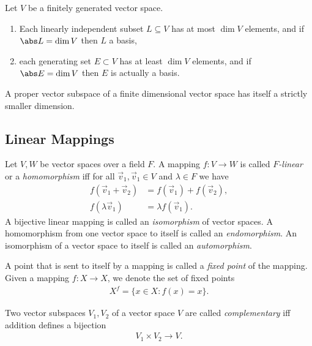 \documentclass{article}
\begin{document}
\begin{corollary}[Notes 1.6.7]
	Let $V$ be a finitely generated vector space.
	\begin{enumerate}
		\item Each linearly independent subset $L\subseteq V$ has at most
		      $\dim V$ elements, and if $\abs L=\dim V$ then $L$ a basis,
		\item each generating set $E\subset V$ has at least $\dim V$ elements,
		      and if $\abs E=\dim V$ then $E$ is actually a basis.
	\end{enumerate}
\end{corollary}

\begin{corollary}[Notes 1.6.8]
	A proper vector subspace of a finite dimensional vector space has itself a
	strictly smaller dimension.
\end{corollary}

\subsection{Linear Mappings}

\begin{definition}
	Let $V,W$ be vector spaces over a field $F$. A mapping $f:V\to W$ is called
	\emph{$F$-linear} or a \emph{homomorphism} iff for all $\vec v_1,\vec v_1\in V$ and $\lambda \in F$ we
	have
	\begin{align*}
		f(\vec v_1+\vec v_2) & = f(\vec v_1) + f(\vec v_2), \\
		f(\lambda \vec v_1)  & = \lambda f(\vec v_1).
	\end{align*}
	A bijective linear mapping is called an \emph{isomorphism} of vector spaces.
	A homomorphism from one vector space to itself is called an \emph{endomorphism}.
	An isomorphism of a vector space to itself is called an \emph{automorphism}.
\end{definition}

\begin{definition}
	A point that is sent to itself by a mapping is called a \emph{fixed point} of
	the mapping. Given a mapping $f:X\to X$, we denote the set of fixed points
	\begin{align*}
		X^f = \{x\in X : f(x)=x\}.
	\end{align*}
\end{definition}

\begin{definition}
	Two vector subspaces $V_1,V_2$ of a vector space $V$ are called \emph{complementary}
	iff addition defines a bijection
	\begin{align*}
		V_1\times V_2 \to V.
	\end{align*}
\end{definition}
\end{document}
